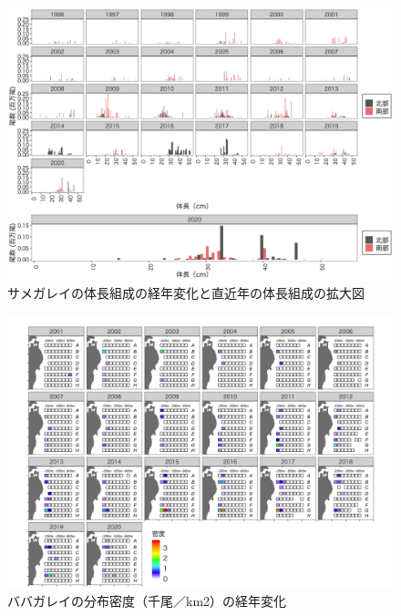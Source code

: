 \documentclass[11pt]{article} %
\begin{document}
\begin{linenumbers}
\begin{figure}[h]
  \centering
  \includegraphics[width = 14cm]{サメガレイlength.png}
  \caption{サメガレイの体長組成の経年変化と直近年の体長組成の拡大図}
\end{figure}

\begin{figure}[h]
  \centering
  \includegraphics[width = 14cm]{ババガレイdens.png}
  \caption{ババガレイの分布密度（千尾／km2）の経年変化}
\end{figure}


\end{linenumbers}
\end{document}
